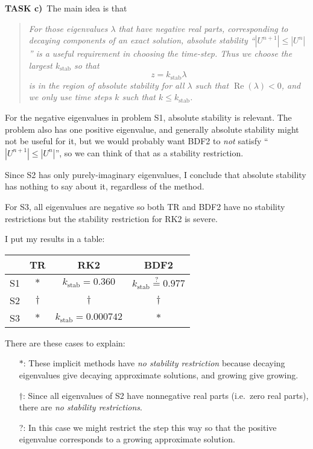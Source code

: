 \documentclass[11pt]{amsart}
\newcommand{\prob}[1]{\bigskip\noindent\textbf{#1}\, }
\begin{document}
\prob{TASK c)}  The main idea is that

\begin{quote}
\emph{For those eigenvalues $\lambda$ that have negative real parts, corresponding to decaying components of an exact solution, absolute stability ``$|U^{n+1}|\le |U^n|$'' is a useful requirement in choosing the time-step.  Thus we choose the largest $k_{\text{stab}}$ so that}
    $$z = k_{\text{stab}} \lambda$$
\emph{is in the region of absolute stability for all $\lambda$ such that $\operatorname{Re}(\lambda)<0$, and we only use time steps $k$ such that $k\le k_{\text{stab}}$.}
\end{quote}

For the negative eigenvalues in problem S1, absolute stability is relevant.  The problem also has one positive eigenvalue, and generally absolute stability might not be useful for it, but we would probably want BDF2 to \emph{not} satisfy ``$|U^{n+1}|\le |U^n|$'', so we can think of that as a stability restriction.

Since S2 has only purely-imaginary eigenvalues, I conclude that absolute stability has nothing to say about it, regardless of the method.

For S3, all eigenvalues are negative so both TR and BDF2 have no stability restrictions but the stability restriction for RK2 is severe.

\clearpage
\newpage

I put my results in a table:

\bigskip
\begin{center}
\begin{tabular}{r|c|c|c}
   & \phantom{sdljf} TR \phantom{sdljf} & \phantom{sdljf} RK2 \phantom{sdljf} & \phantom{sdljf} BDF2 \phantom{sdljf} \\ \hline
S1 & $\ast$ & $k_{\text{stab}} = 0.360$ & $k_{\text{stab}} \stackrel{?}{=} 0.977$\\ \hline
S2 & $\dagger$ & $\dagger$ & $\dagger$ \\ \hline
S3 & $\ast$ & $k_{\text{stab}} = 0.000742$ & $\ast$
\end{tabular}
\end{center}

\bigskip
There are these cases to explain:
\begin{itemize}
\item[$\ast$:]     These implicit methods have \emph{no stability restriction} because decaying eigenvalues give decaying approximate solutions, and growing give growing.
\item[$\dagger$:]  Since all eigenvalues of S2 have nonnegative real parts (i.e.~zero real parts), there are \emph{no stability restrictions}.
\item[?:]          In this case we might restrict the step this way so that the positive eigenvalue corresponds to a growing approximate solution.
\end{itemize}
\end{document}
